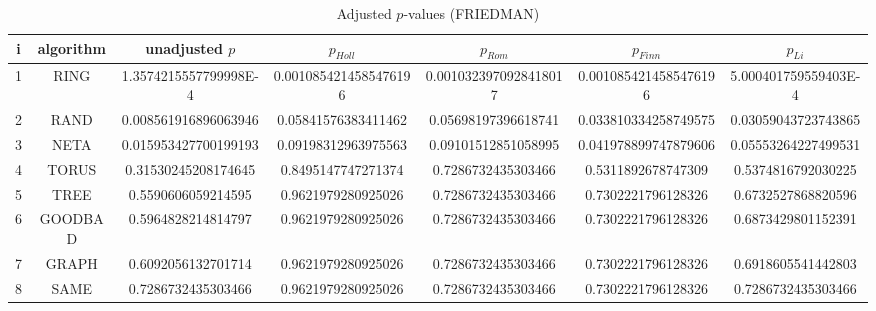 \documentclass[a4paper,10pt]{article}
\begin{document}
\begin{landscape}
\begin{table}[!htp]
\centering\scriptsize
\caption{Adjusted $p$-values (FRIEDMAN)}
\begin{tabular}{ccccccc}
i&algorithm&unadjusted $p$&$p_{Holl}$&$p_{Rom}$&$p_{Finn}$&$p_{Li}$\\
\hline
1& RING&1.3574215557799998E-4&0.0010854214585476196&0.0010323970928418017&0.0010854214585476196&5.000401759559403E-4\\
2& RAND&0.008561916896063946&0.05841576383411462&0.05698197396618741&0.033810334258749575&0.03059043723743865\\
3& NETA&0.015953427700199193&0.09198312963975563&0.09101512851058995&0.041978899747879606&0.05553264227499531\\
4& TORUS&0.31530245208174645&0.8495147747271374&0.7286732435303466&0.5311892678747309&0.5374816792030225\\
5& TREE&0.5590606059214595&0.9621979280925026&0.7286732435303466&0.7302221796128326&0.6732527868820596\\
6& GOODBAD&0.5964828214814797&0.9621979280925026&0.7286732435303466&0.7302221796128326&0.6873429801152391\\
7& GRAPH&0.6092056132701714&0.9621979280925026&0.7286732435303466&0.7302221796128326&0.6918605541442803\\
8& SAME&0.7286732435303466&0.9621979280925026&0.7286732435303466&0.7302221796128326&0.7286732435303466\\
\hline
\end{tabular}
\end{table}


\newpage


\end{landscape}
\end{document}
